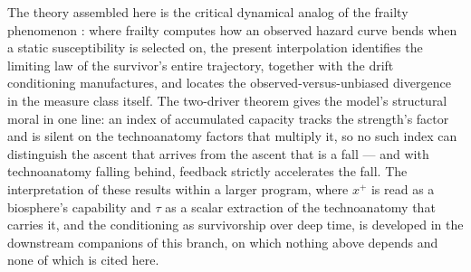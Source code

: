 The theory assembled here is the critical dynamical analog of the
frailty phenomenon \cite{VMS79,VY85}: where frailty computes how an
observed hazard curve bends when a static susceptibility is selected
on, the present interpolation identifies the limiting law of the
survivor's entire trajectory, together with the drift conditioning
manufactures, and locates the observed-versus-unbiased divergence in
the measure class itself. The two-driver theorem gives the model's
structural moral in one line: an index of accumulated capacity tracks
the strength's factor and is silent on the technoanatomy factors that multiply it, so
no such index can distinguish the ascent that arrives from the ascent
that is a fall --- and with technoanatomy falling behind, feedback strictly accelerates
the fall. The interpretation of these results within a larger program, where $x^+$ is read as a biosphere's capability and $\tau$ as a scalar extraction of the
technoanatomy that carries it, and the conditioning as
survivorship over deep time, is developed in the downstream companions of this branch, on which
nothing above depends and none of which is cited here.

